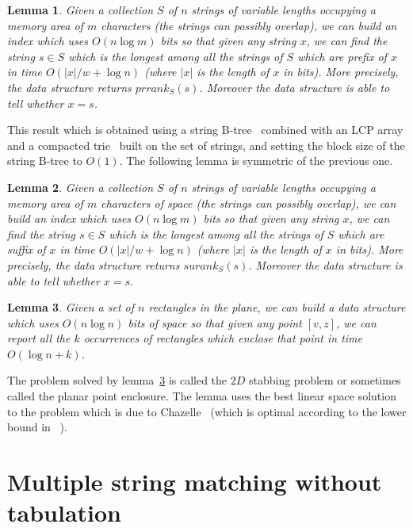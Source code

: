 \documentclass{article}
\newcommand{\?}{\mskip1.5mu}
\newtheorem{lemma}{Lemma}
\begin{document}
\begin{lemma}\cite[Theorem~1]{CHSV08}
\label{lemma3a}
Given a collection $S$ of $n$ strings of variable lengths occupying a memory area of $m$ characters (the strings can possibly overlap), we can build an index which uses $O(n\log m)$ bits so that given any string $x$, we can find the string $s\in S$ which is the longest among all the strings of $S$ which are prefix of $x$ in time $O(|x|/w+\log n)$ (where $|x|$ is the length of $x$ in bits). More precisely, the data structure returns $prrank_S(s)$.
Moreover the data structure is able to tell whether $x=s$.
\end{lemma}
This result which is obtained using a string B-tree~\cite{FG99} combined with an LCP array and a compacted trie~\cite{MM93} built on the set of strings, and setting the block size of the string B-tree to $O(1)$. The following lemma is symmetric of the previous one. 
\begin{lemma}
\label{lemma3b}
Given a collection $S$ of $n$ strings of variable lengths occupying a memory area of $m$ characters of space (the strings can possibly overlap), 
we can build an index which uses $O(n\log m)$ bits so that given any string $x$, we can find the string $s\in S$ which is the longest among all the strings of $S$ which are suffix of $x$ in time $O(|x|/w+\log n)$ (where $|x|$ is the length of $x$ in bits). More precisely, the data structure returns $surank_S(s)$.
Moreover the data structure is able to tell whether $x=s$.
\end{lemma}

\begin{lemma}
\label{lemma4}\cite{C86}
Given a set of $n$ rectangles in the plane, we can build a data structure which uses $O(n\log n)$ bits of space so that given any point $[v,z]$, we can report all the $k$ occurrences of rectangles which enclose that point in time $O(\log n+k)$. 
\end{lemma}
The problem solved by lemma~\ref{lemma4} is called the $2D$ stabbing problem or sometimes called the planar point enclosure. The lemma uses the best linear space solution to the problem which is due to Chazelle~\cite{C86} (which is optimal according to the lower bound in ~\cite{P08a}). 

\section{Multiple string matching without tabulation}
\end{document}
